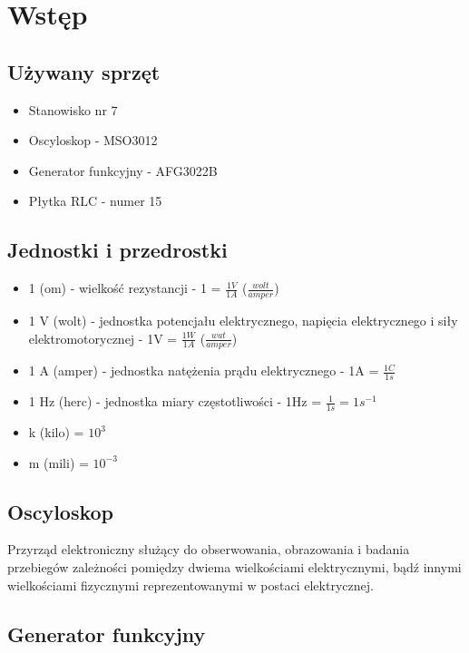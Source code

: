 \chapter{Wstęp}

\section{Używany sprzęt}
\begin{itemize}
    \item Stanowisko nr 7
    \item Oscyloskop - MSO3012 
    \item Generator funkcyjny - AFG3022B
    \item Płytka RLC - numer 15
\end{itemize}

\section {Jednostki i przedrostki}

\begin{itemize}
\item 1 \boldsymbol{\Omega} (om) - wielkość rezystancji - 1\boldsymbol{\Omega} = {$\frac{1V}{1A}$} ($\frac{wolt}{amper}$)
\item 1 V (wolt) - jednostka potencjału elektrycznego, napięcia elektrycznego i siły elektromotorycznej - 1V = $\frac{1W}{1A}$ ($\frac{wat}{amper}$)
\item 1 A (amper) - jednostka natężenia prądu elektrycznego - 1A = $\frac{1C}{1s}$
\item 1 Hz (herc) - jednostka miary częstotliwości - 1Hz = $\frac{1}{1s} = 1s^{-1}$
\end{itemize}

\begin{itemize}
    \item k (kilo) = $10^3$
    \item m (mili) = $10^{-3}$
\end{itemize}


\section {Oscyloskop}
Przyrząd elektroniczny służący do obserwowania, obrazowania i badania przebiegów
zależności pomiędzy dwiema wielkościami elektrycznymi, bądź innymi wielkościami fizycznymi
reprezentowanymi w postaci elektrycznej.
\section {Generator funkcyjny}

